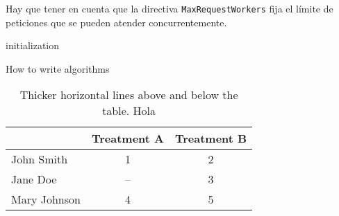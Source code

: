 \documentclass[size=a4, parskip=half, titlepage=false, toc=flat, toc=bib, 12pt]{scrartcl}
\begin{document}
\begin{error}
  Hay que tener en cuenta que la directiva \texttt{MaxRequestWorkers} fija el límite de peticiones que se pueden atender concurrentemente.
\end{error}

\begin{algorithm}[ht]
  initialization\;
  \caption{How to write algorithms}
 \end{algorithm}

 \begin{table}[ht]
  \centering
  \begin{tabular}[t]{lcc}
  \toprule
  &Treatment A&Treatment B\\
  \midrule
  John Smith&1&2\\
  Jane Doe&--&3\\
  Mary Johnson&4&5\\
  \bottomrule
  \end{tabular}
  \caption{Thicker horizontal lines above and below the table. Hola}
  \end{table}%

\end{document}
